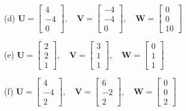 \begin{enumerate}
    \item[(d)] 
    $\mathbf{U} = \begin{bmatrix} 4 \\ -4 \\ 0 \end{bmatrix}, \quad
    \mathbf{V} = \begin{bmatrix} -4 \\ -4 \\ 0 \end{bmatrix}, \quad
    \mathbf{W} = \begin{bmatrix} 0 \\ 0 \\ 10 \end{bmatrix}$
    
    \item[(e)] 
    $\mathbf{U} = \begin{bmatrix} 2 \\ 2 \\ 1 \end{bmatrix}, \quad
    \mathbf{V} = \begin{bmatrix} 3 \\ 1 \\ 1 \end{bmatrix}, \quad
    \mathbf{W} = \begin{bmatrix} 0 \\ 1 \\ 1 \end{bmatrix}$
    
    \item[(f)] 
    $\mathbf{U} = \begin{bmatrix} 4 \\ -4 \\ 2 \end{bmatrix}, \quad
    \mathbf{V} = \begin{bmatrix} 6 \\ -2 \\ 2 \end{bmatrix}, \quad
    \mathbf{W} = \begin{bmatrix} 0 \\ 0 \\ 2 \end{bmatrix}$
\end{enumerate}